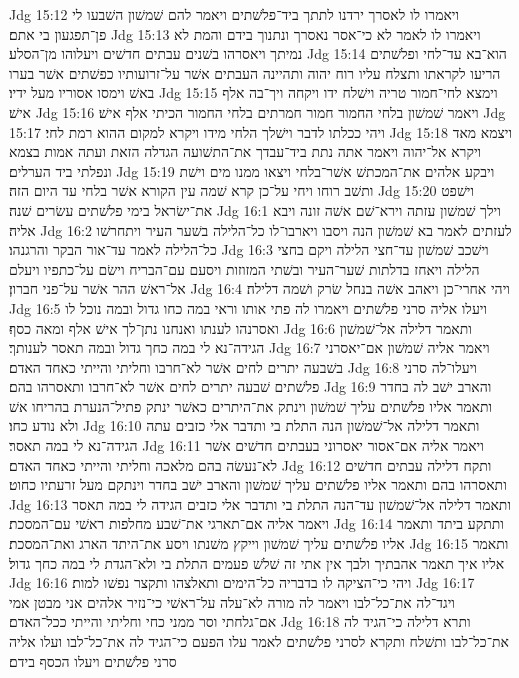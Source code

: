 Jdg 15:12  ויאמרו לו לאסרך ירדנו לתתך ביד־פלשׁתים ויאמר להם שׁמשׁון השׁבעו לי פן־תפגעון בי אתם׃
Jdg 15:13  ויאמרו לו לאמר לא כי־אסר נאסרך ונתנוך בידם והמת לא נמיתך ויאסרהו בשׁנים עבתים חדשׁים ויעלוהו מן־הסלע׃
Jdg 15:14  הוא־בא עד־לחי ופלשׁתים הריעו לקראתו ותצלח עליו רוח יהוה ותהיינה העבתים אשׁר על־זרועותיו כפשׁתים אשׁר בערו באשׁ וימסו אסוריו מעל ידיו׃
Jdg 15:15  וימצא לחי־חמור טריה וישׁלח ידו ויקחה ויך־בה אלף אישׁ׃
Jdg 15:16  ויאמר שׁמשׁון בלחי החמור חמור חמרתים בלחי החמור הכיתי אלף אישׁ׃
Jdg 15:17  ויהי ככלתו לדבר וישׁלך הלחי מידו ויקרא למקום ההוא רמת לחי׃
Jdg 15:18  ויצמא מאד ויקרא אל־יהוה ויאמר אתה נתת ביד־עבדך את־התשׁועה הגדלה הזאת ועתה אמות בצמא ונפלתי ביד הערלים׃
Jdg 15:19  ויבקע אלהים את־המכתשׁ אשׁר־בלחי ויצאו ממנו מים וישׁת ותשׁב רוחו ויחי על־כן קרא שׁמה עין הקורא אשׁר בלחי עד היום הזה׃
Jdg 15:20  וישׁפט את־ישׂראל בימי פלשׁתים עשׂרים שׁנה׃
Jdg 16:1  וילך שׁמשׁון עזתה וירא־שׁם אשׁה זונה ויבא אליה׃
Jdg 16:2  לעזתים לאמר בא שׁמשׁון הנה ויסבו ויארבו־לו כל־הלילה בשׁער העיר ויתחרשׁו כל־הלילה לאמר עד־אור הבקר והרגנהו׃
Jdg 16:3  וישׁכב שׁמשׁון עד־חצי הלילה ויקם בחצי הלילה ויאחז בדלתות שׁער־העיר ובשׁתי המזוזות ויסעם עם־הבריח וישׂם על־כתפיו ויעלם אל־ראשׁ ההר אשׁר על־פני חברון׃
Jdg 16:4  ויהי אחרי־כן ויאהב אשׁה בנחל שׂרק ושׁמה דלילה׃
Jdg 16:5  ויעלו אליה סרני פלשׁתים ויאמרו לה פתי אותו וראי במה כחו גדול ובמה נוכל לו ואסרנהו לענתו ואנחנו נתן־לך אישׁ אלף ומאה כסף׃
Jdg 16:6  ותאמר דלילה אל־שׁמשׁון הגידה־נא לי במה כחך גדול ובמה תאסר לענותך׃
Jdg 16:7  ויאמר אליה שׁמשׁון אם־יאסרני בשׁבעה יתרים לחים אשׁר לא־חרבו וחליתי והייתי כאחד האדם׃
Jdg 16:8  ויעלו־לה סרני פלשׁתים שׁבעה יתרים לחים אשׁר לא־חרבו ותאסרהו בהם׃
Jdg 16:9  והארב ישׁב לה בחדר ותאמר אליו פלשׁתים עליך שׁמשׁון וינתק את־היתרים כאשׁר ינתק פתיל־הנערת בהריחו אשׁ ולא נודע כחו׃
Jdg 16:10  ותאמר דלילה אל־שׁמשׁון הנה התלת בי ותדבר אלי כזבים עתה הגידה־נא לי במה תאסר׃
Jdg 16:11  ויאמר אליה אם־אסור יאסרוני בעבתים חדשׁים אשׁר לא־נעשׂה בהם מלאכה וחליתי והייתי כאחד האדם׃
Jdg 16:12  ותקח דלילה עבתים חדשׁים ותאסרהו בהם ותאמר אליו פלשׁתים עליך שׁמשׁון והארב ישׁב בחדר וינתקם מעל זרעתיו כחוט׃
Jdg 16:13  ותאמר דלילה אל־שׁמשׁון עד־הנה התלת בי ותדבר אלי כזבים הגידה לי במה תאסר ויאמר אליה אם־תארגי את־שׁבע מחלפות ראשׁי עם־המסכת׃
Jdg 16:14  ותתקע ביתד ותאמר אליו פלשׁתים עליך שׁמשׁון וייקץ משׁנתו ויסע את־היתד הארג ואת־המסכת׃
Jdg 16:15  ותאמר אליו איך תאמר אהבתיך ולבך אין אתי זה שׁלשׁ פעמים התלת בי ולא־הגדת לי במה כחך גדול׃
Jdg 16:16  ויהי כי־הציקה לו בדבריה כל־הימים ותאלצהו ותקצר נפשׁו למות׃
Jdg 16:17  ויגד־לה את־כל־לבו ויאמר לה מורה לא־עלה על־ראשׁי כי־נזיר אלהים אני מבטן אמי אם־גלחתי וסר ממני כחי וחליתי והייתי ככל־האדם׃
Jdg 16:18  ותרא דלילה כי־הגיד לה את־כל־לבו ותשׁלח ותקרא לסרני פלשׁתים לאמר עלו הפעם כי־הגיד לה את־כל־לבו ועלו אליה סרני פלשׁתים ויעלו הכסף בידם׃
